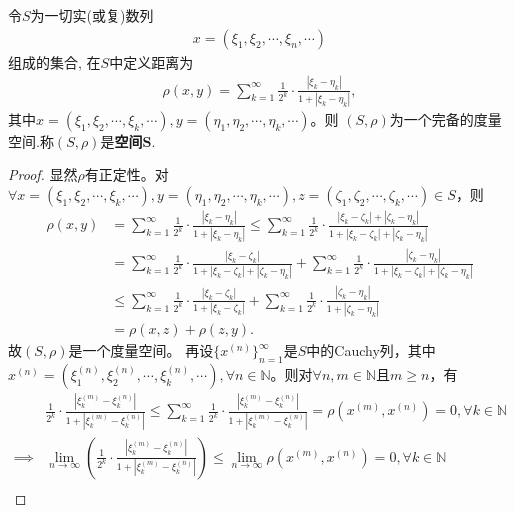 \documentclass[../../main.tex]{subfiles}%
\begin{document}
\begin{proposition}\label{proposition:空间S是完备度量空间}
令$S$为一切实(或复)数列
\begin{align*}
x=(\xi_1,\xi_2,\cdots,\xi_n,\cdots)
\end{align*}
组成的集合, 在$S$中定义距离为
\begin{align*}
\rho(x,y)=\sum\limits_{k=1}^{\infty}\frac{1}{2^k}\cdot\frac{|\xi_k-\eta_k|}{1+|\xi_k-\eta_k|},
\end{align*}
其中$x=(\xi_1,\xi_2,\cdots,\xi_k,\cdots), y=(\eta_1,\eta_2,\cdots,\eta_k,\cdots)$。则 $(S,\rho)$为一个完备的度量空间.称$(S,\rho)$是\textbf{空间}$\bm{S}$.
\end{proposition}
\begin{proof}
显然$\rho$有正定性。对$\forall x=(\xi_1,\xi_2,\cdots,\xi_k,\cdots),y=(\eta_1,\eta_2,\cdots,\eta_k,\cdots),z=(\zeta_1,\zeta_2,\cdots,\zeta_k,\cdots)\in S$，则
\begin{align*}
\rho(x,y)&=\sum\limits_{k=1}^{\infty}\frac{1}{2^k}\cdot\frac{|\xi_k-\eta_k|}{1+|\xi_k-\eta_k|}\leqslant\sum\limits_{k=1}^{\infty}\frac{1}{2^k}\cdot\frac{|\xi_k-\zeta_k|+|\zeta_k-\eta_k|}{1+|\xi_k-\zeta_k|+|\zeta_k-\eta_k|}\\
&=\sum\limits_{k=1}^{\infty}\frac{1}{2^k}\cdot\frac{|\xi_k-\zeta_k|}{1+|\xi_k-\zeta_k|+|\zeta_k-\eta_k|}+\sum\limits_{k=1}^{\infty}\frac{1}{2^k}\cdot\frac{|\zeta_k-\eta_k|}{1+|\xi_k-\zeta_k|+|\zeta_k-\eta_k|}\\
&\leqslant\sum\limits_{k=1}^{\infty}\frac{1}{2^k}\cdot\frac{|\xi_k-\zeta_k|}{1+|\xi_k-\zeta_k|}+\sum\limits_{k=1}^{\infty}\frac{1}{2^k}\cdot\frac{|\zeta_k-\eta_k|}{1+|\zeta_k-\eta_k|}\\
&=\rho(x,z)+\rho(z,y).
\end{align*}
故$(S,\rho)$是一个度量空间。
再设$\{x^{(n)}\}_{n=1}^{\infty}$是$S$中的Cauchy列，其中$x^{(n)}=(\xi_1^{(n)},\xi_2^{(n)},\cdots,\xi_k^{(n)},\cdots),\forall n\in\mathbb{N}$。则对$\forall n,m\in\mathbb{N}$且$m\geqslant n$，有
\begin{align*}
&\frac{1}{2^k}\cdot\frac{|\xi_k^{(m)}-\xi_k^{(n)}|}{1+|\xi_k^{(m)}-\xi_k^{(n)}|}\leqslant\sum\limits_{k=1}^{\infty}\frac{1}{2^k}\cdot\frac{|\xi_k^{(m)}-\xi_k^{(n)}|}{1+|\xi_k^{(m)}-\xi_k^{(n)}|}=\rho(x^{(m)},x^{(n)})=0,\forall k\in\mathbb{N}\\
\implies&\lim\limits_{n\rightarrow\infty}\left(\frac{1}{2^k}\cdot\frac{|\xi_k^{(m)}-\xi_k^{(n)}|}{1+|\xi_k^{(m)}-\xi_k^{(n)}|}\right)\leqslant\lim\limits_{n\rightarrow\infty}\rho(x^{(m)},x^{(n)})=0,\forall k\in\mathbb{N}\\

\end{align*}
\end{proof}
\end{document}
